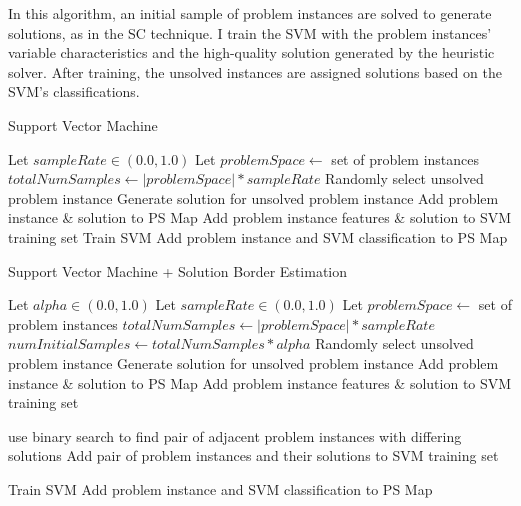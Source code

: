 In this algorithm, an initial sample of problem instances are solved to generate solutions, as in the SC technique.  I train the SVM with the problem instances' variable characteristics and the high-quality solution generated by the heuristic solver.    After training, the unsolved instances are assigned solutions based on  the SVM's classifications.


\begin{algorithm}
\caption{Support Vector Machine}   
\label{alg:svm}
\small
\begin{algorithmic}[1] %
  
  \State Let $sampleRate \in (0.0,1.0)$
  \State Let $problemSpace \leftarrow$ set of problem instances
  \State $totalNumSamples \leftarrow |problemSpace| * sampleRate$
    \State Randomly select unsolved problem instance
    \State Generate solution for unsolved problem instance
    \State Add problem instance \& solution to PS Map
    \State Add problem instance features \& solution to SVM training set
  \EndFor
  \State Train SVM
    \State Add problem instance and SVM classification to PS Map
  \EndFor
\end{algorithmic}
\end{algorithm}

\begin{algorithm}
\caption{Support Vector Machine + Solution Border Estimation}   
\label{alg:svm+sbe}
\small
\begin{algorithmic}[1] %
  
  \State Let $alpha \in (0.0,1.0)$
  \State Let $sampleRate \in (0.0,1.0)$
  \State Let $problemSpace \leftarrow$ set of problem instances
  \State $totalNumSamples \leftarrow |problemSpace| * sampleRate$
  \State $numInitialSamples \leftarrow totalNumSamples * alpha$ 
    \State Randomly select unsolved problem instance
    \State Generate solution for unsolved problem instance
    \State Add problem instance \& solution to PS Map
    \State Add problem instance features \& solution to SVM training set
  \EndFor

   \label{alg:svmsbe:binarysearch}
    \State use binary search to find pair of adjacent problem instances with differing solutions
    \State Add pair of problem instances and their solutions to SVM training set
  \EndFor

  \State Train SVM
   \label{alg:svmsbe:makemap}
    \State Add problem instance and SVM classification to PS Map
  \EndFor
\end{algorithmic}
\end{algorithm}



